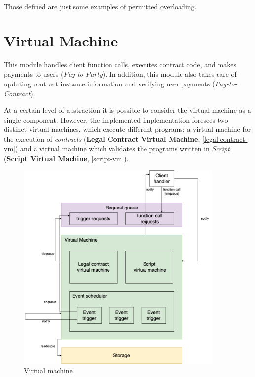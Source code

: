 Those defined are just some examples of permitted overloading.

\section{Virtual Machine}
\label{virtual-machine}

This module handles client function calls, executes contract code, and makes payments to users 
(\textit{Pay-to-Party}). In addition, this module also takes care of updating contract instance 
information and verifying user payments (\textit{Pay-to-Contract}).

At a certain level of abstraction it is possible to consider the virtual machine as a single component. 
However, the implemented implementation foresees two distinct virtual machines, which execute different 
programs: a virtual machine for the execution of \textit{contracts} 
(\textbf{Legal Contract Virtual Machine}, \ref{legal-contract-vm}) and a virtual machine which validates 
the programs written in \textit{Script} (\textbf{Script Virtual Machine}, \ref{script-vm}).

\begin{figure}[htbp]
	\begin{center}
		\includegraphics[width=0.9\textwidth]{immagini/capitolo-5/vm.png}
		\caption{Virtual machine.}
		\label{fig:vm}
	\end{center}
\end{figure}

